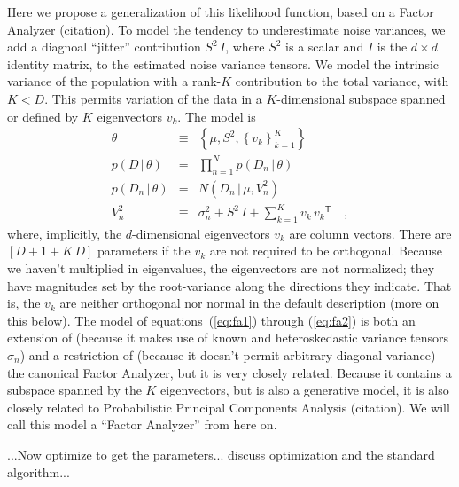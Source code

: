 \documentclass[12pt]{article}
\newcommand{\equationname}{equation}
\newcommand{\equationnames}{\equationname s}
\newcommand{\given}{\,|\,}
\newcommand{\setof}[1]{\left\{{#1}\right\}}
\newcommand{\transpose}[1]{{#1}^{\!{\mathsf{T}}}}
\begin{document}
Here we propose a generalization of this likelihood function, based on
a Factor Analyzer (citation).  To model the tendency to underestimate
noise variances, we add a diagnoal ``jitter'' contribution $S^2\,I$,
where $S^2$ is a scalar and $I$ is the $d\times d$ identity matrix, to
the estimated noise variance tensors.  We model the intrinsic variance
of the population with a rank-$K$ contribution to the total variance,
with $K<D$.  This permits variation of the data in a $K$-dimensional
subspace spanned or defined by $K$ eigenvectors $v_k$.  The model is
\begin{eqnarray}\label{eq:fa1}
\theta
 &\equiv&
\setof{\mu, S^2, \setof{v_k}_{k=1}^K}
\\
p(D\given\theta)
 &=&
\prod_{n=1}^N p(D_n\given\theta)
\\
p(D_n\given\theta)
 &=&
N(D_n\given\mu,V^2_n)
\\\label{eq:fa2}
V^2_n
 &\equiv&
\sigma^2_n + S^2\,I + \sum_{k=1}^K v_k\,\transpose{v_k}
\quad ,
\end{eqnarray}
where, implicitly, the $d$-dimensional eigenvectors $v_k$ are column
vectors.  There are $[D + 1 + K\,D]$ parameters if the $v_k$ are not
required to be orthogonal.  Because we haven't multiplied in
eigenvalues, the eigenvectors are not normalized; they have magnitudes
set by the root-variance along the directions they indicate.  That is,
the $v_k$ are neither orthogonal nor normal in the default description
(more on this below).  The model of \equationnames~(\ref{eq:fa1})
through (\ref{eq:fa2}) is both an extension of (because it makes use
of known and heteroskedastic variance tensors $\sigma_n$) and a
restriction of (because it doesn't permit arbitrary diagonal variance)
the canonical Factor Analyzer, but it is very closely related.
Because it contains a subspace spanned by the $K$ eigenvectors, but is
also a generative model, it is also closely related to Probabilistic
Principal Components Analysis (citation).  We will call this model a
``Factor Analyzer'' from here on.

...Now optimize to get the parameters... discuss optimization and the
standard algorithm...
\end{document}
